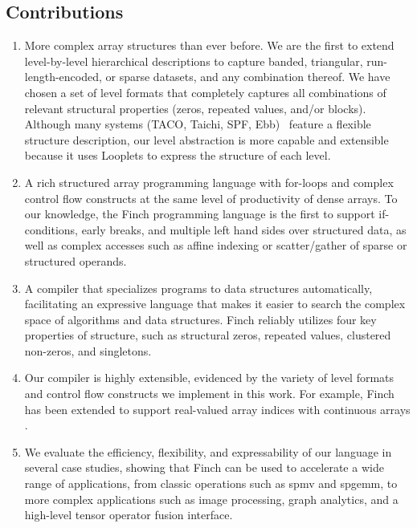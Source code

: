 \subsection{Contributions}


\begin{enumerate}
\item More complex array structures than ever before. We are the first to extend level-by-level hierarchical descriptions to capture banded, triangular, run-length-encoded, or sparse datasets, and any combination thereof.
%
We have chosen a set of level formats that completely captures all combinations of relevant structural properties (zeros, repeated values, and/or blocks).
%
Although many systems (TACO, Taichi, SPF, Ebb)~\cite{chou2018format,  hu_taichi_2019, strout2018sparse, bernstein2016ebb} feature a flexible structure description, our level abstraction is more capable and extensible because it uses Looplets \cite{ahrens_looplets_2023} to express the structure of each level. 
%
\item A rich structured array programming language with for-loops and complex control flow constructs at the same level of productivity of dense arrays. 
%
To our knowledge, the Finch programming language is the first to support if-conditions, early breaks, and multiple left hand sides over structured data, as well as complex accesses such as affine indexing or scatter/gather of sparse or structured operands.
%
\item A compiler that specializes programs to data structures automatically, facilitating an expressive language that makes it easier to search the complex space of algorithms and data structures. Finch reliably utilizes four key properties of structure, such as structural zeros, repeated values, clustered non-zeros, and singletons.
%
\item Our compiler is highly extensible, evidenced by the variety of level formats and control flow constructs we implement in this work.
%
For example, Finch has been extended to support real-valued array indices with continuous arrays \cite{won2024continuous}.
%
\item We evaluate the efficiency, flexibility, and expressability of our language in several case studies, showing that Finch can be used to accelerate a wide range of applications,  from classic operations such as spmv and spgemm, to more complex applications such as image processing, graph analytics, and a high-level tensor operator fusion interface.

\end{enumerate}
